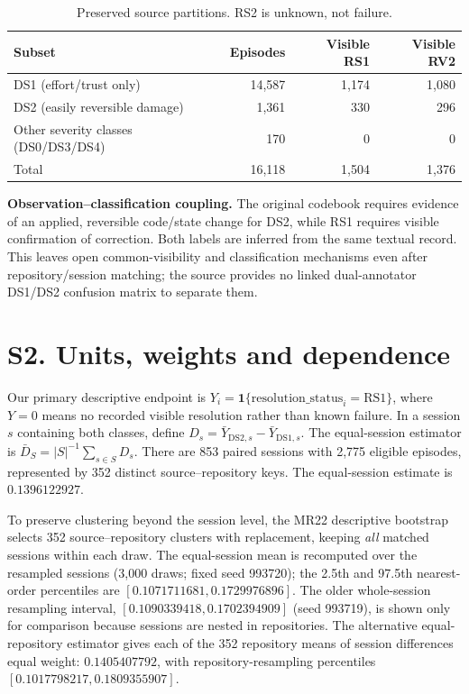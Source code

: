\documentclass[10pt,a4paper]{article}
\begin{document}
\begin{table}[h!]
\centering\small
\caption{Preserved source partitions. RS2 is unknown, not failure.}
\begin{tabular}{lrrr}
\toprule
Subset & Episodes & Visible RS1 & Visible RV2\\\midrule
DS1 (effort/trust only) & 14,587 & 1,174 & 1,080\\
DS2 (easily reversible damage) & 1,361 & 330 & 296\\
Other severity classes (DS0/DS3/DS4) & 170 & 0 & 0\\
\midrule
Total & 16,118 & 1,504 & 1,376\\
\bottomrule
\end{tabular}
\end{table}

\noindent\textbf{Observation--classification coupling.} The original codebook requires evidence of an applied, reversible code/state change for DS2, while RS1 requires visible confirmation of correction. Both labels are inferred from the same textual record. This leaves open common-visibility and classification mechanisms even after repository/session matching; the source provides no linked dual-annotator DS1/DS2 confusion matrix to separate them.

\section*{S2. Units, weights and dependence}
Our primary descriptive endpoint is $Y_i=\mathbf{1}\{\mathrm{resolution\_status}_i=\mathrm{RS1}\}$, where $Y=0$ means no recorded visible resolution rather than known failure. In a session $s$ containing both classes, define $D_s=\bar{Y}_{\mathrm{DS2},s}-\bar{Y}_{\mathrm{DS1},s}$. The equal-session estimator is $\bar{D}_{S}=|S|^{-1}\sum_{s\in S} D_s$. There are 853 paired sessions with 2,775 eligible episodes, represented by 352 distinct source--repository keys. The equal-session estimate is $0.1396122927$.

To preserve clustering beyond the session level, the MR22 descriptive bootstrap selects 352 source--repository clusters with replacement, keeping \emph{all} matched sessions within each draw. The equal-session mean is recomputed over the resampled sessions (3,000 draws; fixed seed 993720); the 2.5th and 97.5th nearest-order percentiles are $[0.1071711681,0.1729976896]$. The older whole-session resampling interval, $[0.1090339418,0.1702394909]$ (seed 993719), is shown only for comparison because sessions are nested in repositories. The alternative equal-repository estimator gives each of the 352 repository means of session differences equal weight: $0.1405407792$, with repository-resampling percentiles $[0.1017798217,0.1809355907]$.
\end{document}
